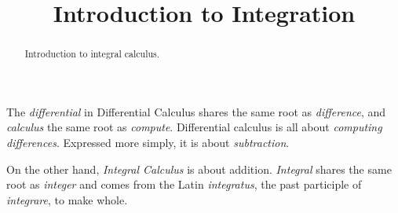 \documentclass{ximera}
\title{Introduction to Integration}
\begin{document}
\begin{abstract}
Introduction to integral calculus.
\end{abstract}
\maketitle

The \emph{differential} in Differential Calculus shares the same root as \emph{difference}, and \emph{calculus} the same root as \emph{compute}. Differential calculus is all about \emph{computing differences}. Expressed more simply, it is about \emph{subtraction}.

On the other hand, \emph{Integral Calculus} is about addition. \emph{Integral} shares the same root as \emph{integer} and comes from the Latin \emph{integratus}, the past participle of \emph{integrare}, to make whole. 
\end{document}

